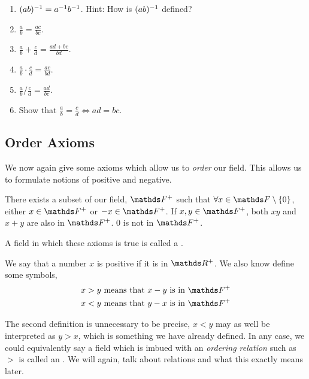 \begin{exc}
\begin{exercise}
    \begin{enumerate}
        \item \((ab)^{-1} = a^{-1} b^{-1}\). Hint: How is \((ab)^{-1}\) defined?
        \item \(\displaystyle \frac{a}{b} = \frac{ac}{bc}\).
        \item \(\displaystyle \frac{a}{b} + \frac{c}{d} = \frac{ad + bc}{bd}\).
        \item \(\displaystyle \frac{a}{b} \cdot \frac{c}{d} = \frac{ac}{bd}\).
        \item \(\displaystyle \frac{a}{b} {\bigg/} \frac{c}{d} = \frac{ad}{bc}\). 
        \item Show that \(\displaystyle\frac{a}{b} = \frac{c}{d} \iff ad = bc\).  
    \end{enumerate}
\end{exercise}

\end{exc}

\subsection{Order Axioms}

We now again give some axioms which allow us to \emph{order} our field. This allows us to formulate notions 
of positive and negative. 

\begin{axioms}
    \ii There exists a subset of our field, \(\FF^+\) such that \(\forall x \in \FF \setminus \Set{0}\),
     either \(x \in \FF^+\) or \(-x \in \FF^+\).
    \ii If \(x, y \in \FF^+\), both \(xy\) and \(x + y\) are also in \(\FF^+\).
    \ii \(0\) is not in \(\FF^+\).
\end{axioms}

A field in which these axioms is true is called a .

We say that a number \(x\) is positive if it is in \(\RR^+\). We also know define some symbols, 
\begin{align*}
    x > y \text{ means that } x - y \text{ is in } \FF^+ \\
    x < y \text{ means that } y - x \text{ is in } \FF^+ 
\end{align*}

The second definition is unnecessary to be precise, \(x < y\) may as well be 
interpreted as \(y > x\), which is something we have already defined. In any case, 
we could equivalently say a field which is imbued with an \emph{ordering relation} such as \(>\) is called 
an . We will again, talk about relations and what this exactly 
means later.


